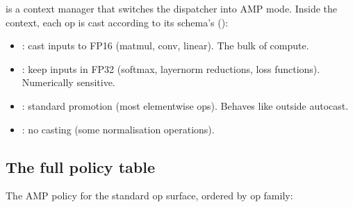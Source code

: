  is a context
manager that switches the dispatcher into AMP mode. Inside the
context, each op is cast according to its schema's
 ():

\begin{itemize}
  \item {}: cast inputs to FP16 (matmul, conv,
    linear). The bulk of compute.
  \item {}: keep inputs in FP32 (softmax,
    layernorm reductions, loss functions). Numerically sensitive.
  \item {}: standard promotion (most
    elementwise ops). Behaves like outside autocast.
  \item {}: no casting (some normalisation
    operations).
\end{itemize}

\subsection{The full policy table}
\label{ssec:amp:full_policy_table}

The AMP policy for the standard op surface, ordered by op
family:


